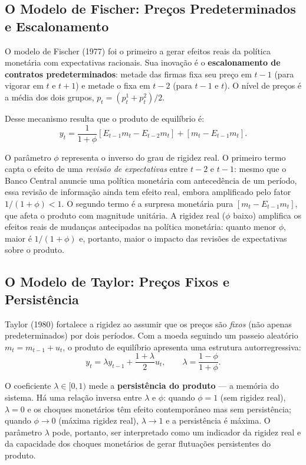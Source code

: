 \documentclass[12pt, a4paper]{article}
\begin{document}
\subsection{O Modelo de Fischer: Preços Predeterminados e Escalonamento}

O modelo de Fischer (1977) foi o primeiro a gerar efeitos reais da política monetária com expectativas racionais. Sua inovação é o \textbf{escalonamento de contratos predeterminados}: metade das firmas fixa seu preço em $t-1$ (para vigorar em $t$ e $t+1$) e metade o fixa em $t-2$ (para $t-1$ e $t$). O nível de preços é a média dos dois grupos, $p_t = (p_t^1 + p_t^2)/2$.

Desse mecanismo resulta que o produto de equilíbrio é:
\[
y_t = \frac{1}{1+\phi}\left[E_{t-1}m_t - E_{t-2}m_t\right] + \left[m_t - E_{t-1}m_t\right].
\]

O parâmetro $\phi$ representa o inverso do grau de rigidez real. O primeiro termo capta o efeito de uma \emph{revisão de expectativas} entre $t-2$ e $t-1$: mesmo que o Banco Central anuncie uma política monetária com antecedência de um período, essa revisão de informação ainda tem efeito real, embora amplificado pelo fator $1/(1+\phi) < 1$. O segundo termo é a surpresa monetária pura $[m_t - E_{t-1}m_t]$, que afeta o produto com magnitude unitária. A rigidez real ($\phi$ baixo) amplifica os efeitos reais de mudanças antecipadas na política monetária: quanto menor $\phi$, maior é $1/(1+\phi)$ e, portanto, maior o impacto das revisões de expectativas sobre o produto.

\subsection{O Modelo de Taylor: Preços Fixos e Persistência}

Taylor (1980) fortalece a rigidez ao assumir que os preços são \emph{fixos} (não apenas predeterminados) por dois períodos. Com a moeda seguindo um passeio aleatório $m_t = m_{t-1} + u_t$, o produto de equilíbrio apresenta uma estrutura autorregressiva:
\[
y_t = \lambda y_{t-1} + \frac{1+\lambda}{2}u_t, \qquad \lambda = \frac{1-\phi}{1+\phi}.
\]

O coeficiente $\lambda \in [0,1)$ mede a \textbf{persistência do produto} — a memória do sistema. Há uma relação inversa entre $\lambda$ e $\phi$: quando $\phi = 1$ (sem rigidez real), $\lambda = 0$ e os choques monetários têm efeito contemporâneo mas sem persistência; quando $\phi \to 0$ (máxima rigidez real), $\lambda \to 1$ e a persistência é máxima. O parâmetro $\lambda$ pode, portanto, ser interpretado como um indicador da rigidez real e da capacidade dos choques monetários de gerar flutuações persistentes do produto.
\end{document}
